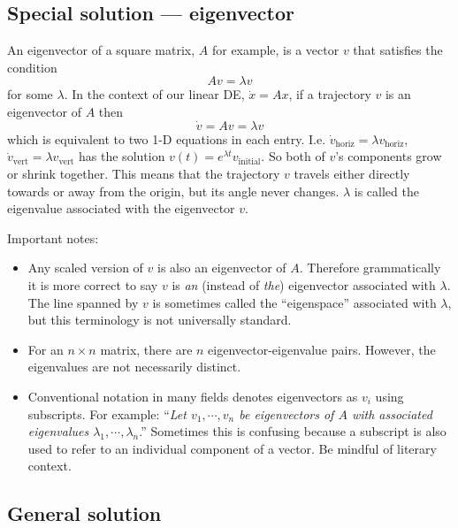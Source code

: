 \documentclass[11pt, oneside]{article}   	%
\begin{document}
\subsection*{Special solution --- eigenvector}

An eigenvector of a square matrix, $A$ for example, is a vector $v$ that satisfies the condition
\begin{equation}
Av = \lambda v
\end{equation}
for some $\lambda$.
In the context of our linear DE, $\dot{x} = Ax$, if a trajectory $v$ is an eigenvector of $A$ then
\begin{equation}
\dot{v} = Av = \lambda v
\end{equation}
which is equivalent to two 1-D equations in each entry.
I.e. $\dot{v}_\mathrm{horiz} = \lambda v_\mathrm{horiz}$, $\dot{v}_\mathrm{vert} = \lambda v_\mathrm{vert}$
has the solution $v(t) = e^{\lambda t}v_{\mathrm{initial}}$.
So both of $v$'s components grow or shrink together.
This means that the trajectory $v$ travels either directly towards or away from the origin, but its angle never changes.
$\lambda$ is called the eigenvalue associated with the eigenvector $v$.

Important notes:
\begin{itemize}
\item Any scaled version of $v$ is also an eigenvector of $A$.
Therefore grammatically it is more correct to say $v$ is \textit{an} (instead of \textit{the}) eigenvector associated with $\lambda$.
The line spanned by $v$ is sometimes called the ``eigenspace'' associated with $\lambda$, but this terminology is not universally standard.
\item For an $n\times n$ matrix, there are $n$ eigenvector-eigenvalue pairs. However, the eigenvalues are not necessarily distinct.
\item Conventional notation in many fields denotes eigenvectors as $v_i$ using subscripts.
For example: ``\textit{Let $ v_1,\cdots,v_n $ be eigenvectors of $A$ with associated eigenvalues $ \lambda_1,\cdots,\lambda_n $}.''
Sometimes this is confusing because a subscript is also used to refer to an individual component of a vector.
Be mindful of literary context.
\end{itemize}

\subsection*{General solution}
\end{document}
